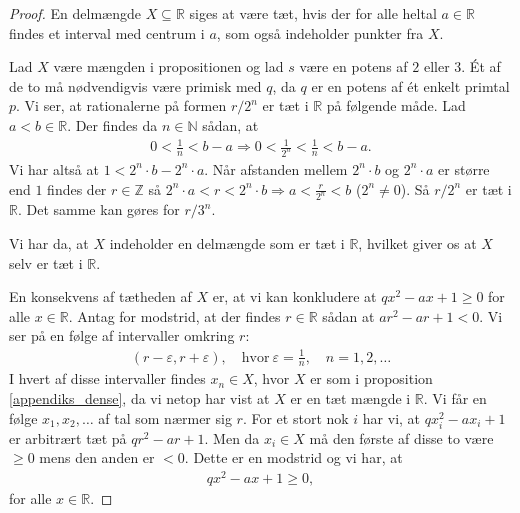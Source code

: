 \begin{proof}
En delmængde $X \subseteq \mathbb{R}$ siges at være tæt, hvis der for alle heltal $a \in \mathbb{R}$ findes et interval med centrum i $a$, som også indeholder punkter fra $X$. 

Lad $X$ være mængden i propositionen og lad $s$ være en potens af $2$ eller $3$. Ét af de to må nødvendigvis være primisk med $q$, da $q$ er en potens af ét enkelt primtal $p$. Vi ser, at rationalerne på formen $r/2^n$ er tæt i $\mathbb{R}$ på følgende måde. Lad $a < b \in \mathbb{R}$. Der findes da $n \in \mathbb{N}$ sådan, at 
\begin{align*}
	0 < \frac{1}{n} < b - a \Rightarrow 0 < \frac{1}{2^n} < \frac{1}{n} < b - a.
\end{align*}
Vi har altså at $1 < 2^n \cdot b - 2^n \cdot a$. Når afstanden mellem $2^n \cdot b$ og $2^n \cdot a$ er større end $1$ findes der $r \in \mathbb{Z}$ så $2^n \cdot a < r < 2^n \cdot b \Rightarrow a < \frac{r}{2^n} < b$ 
($2^n \neq 0$). Så $r/2^n$ er tæt i $\mathbb{R}$. Det samme kan gøres for $r/3^n$.

Vi har da, at $X$ indeholder en delmængde som er tæt i $\mathbb{R}$, hvilket giver os at $X$ selv er tæt i $\mathbb{R}$.

En konsekvens af tætheden af $X$ er, at vi kan konkludere at $qx^2 - ax +1 \geq 0$ for alle 
$x \in \mathbb{R}$. Antag for modstrid, at der findes $r \in \mathbb{R}$ sådan at $ar^2 -ar + 1 < 0$. Vi ser på en følge af intervaller omkring $r$:
\begin{align*}
	(r - \varepsilon, r + \varepsilon), \quad \text{hvor} \ \varepsilon = \frac{1}{n}, \quad n = 1, 2, \ldots
\end{align*}
I hvert af disse intervaller findes $x_n \in X$, hvor $X$ er som i proposition \ref{appendiks_dense}, da vi netop har vist at $X$ er en tæt mængde i $\mathbb{R}$. Vi får en følge $x_1, x_2, \ldots$ af tal som nærmer sig $r$. For et stort nok $i$ har vi, at $qx_{i}^{2} -ax_i + 1$ er arbitrært tæt på $qr^2 - ar + 1$. Men da $x_i \in X$ må den første af disse to være $\geq 0$ mens den anden er $< 0$. Dette er en modstrid og vi har, at 
\begin{align*}
	qx^2 - ax +1 \geq 0,
\end{align*}
for alle $x \in \mathbb{R}$.
\end{proof}


